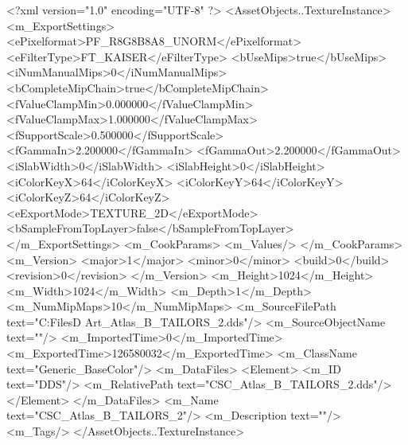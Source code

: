 <?xml version="1.0" encoding="UTF-8" ?>
<AssetObjects..TextureInstance>
	<m_ExportSettings>
		<ePixelformat>PF_R8G8B8A8_UNORM</ePixelformat>
		<eFilterType>FT_KAISER</eFilterType>
		<bUseMips>true</bUseMips>
		<iNumManualMips>0</iNumManualMips>
		<bCompleteMipChain>true</bCompleteMipChain>
		<fValueClampMin>0.000000</fValueClampMin>
		<fValueClampMax>1.000000</fValueClampMax>
		<fSupportScale>0.500000</fSupportScale>
		<fGammaIn>2.200000</fGammaIn>
		<fGammaOut>2.200000</fGammaOut>
		<iSlabWidth>0</iSlabWidth>
		<iSlabHeight>0</iSlabHeight>
		<iColorKeyX>64</iColorKeyX>
		<iColorKeyY>64</iColorKeyY>
		<iColorKeyZ>64</iColorKeyZ>
		<eExportMode>TEXTURE_2D</eExportMode>
		<bSampleFromTopLayer>false</bSampleFromTopLayer>
	</m_ExportSettings>
	<m_CookParams>
		<m_Values/>
	</m_CookParams>
	<m_Version>
		<major>1</major>
		<minor>0</minor>
		<build>0</build>
		<revision>0</revision>
	</m_Version>
	<m_Height>1024</m_Height>
	<m_Width>1024</m_Width>
	<m_Depth>1</m_Depth>
	<m_NumMipMaps>10</m_NumMipMaps>
	<m_SourceFilePath text="C:\Users\Shadow\Desktop\Working Files\3D Art\Textures\CSC_Atlas_B_TAILORS_2.dds"/>
	<m_SourceObjectName text=""/>
	<m_ImportedTime>0</m_ImportedTime>
	<m_ExportedTime>126580032</m_ExportedTime>
	<m_ClassName text="Generic_BaseColor"/>
	<m_DataFiles>
		<Element>
			<m_ID text="DDS"/>
			<m_RelativePath text="CSC_Atlas_B_TAILORS_2.dds"/>
		</Element>
	</m_DataFiles>
	<m_Name text="CSC_Atlas_B_TAILORS_2"/>
	<m_Description text=""/>
	<m_Tags/>
</AssetObjects..TextureInstance>

